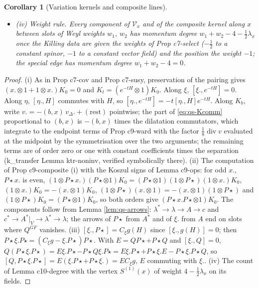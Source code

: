 \documentclass[11pt]{article}
\numberwithin{equation}{section}
\theoremstyle{plain}
\newtheorem{corollary}[theorem]{Corollary}
\theoremstyle{definition}
\begin{document}
\begin{corollary}[Variation kernels and composite lines]
\begin{itemize}
\item (iv) Weight rule. Every component of $\mathcal V_x$ and of the composite kernel along $x$ between slots of Weyl weights $w_1$, $w_2$ has momentum degree $w_1+w_2-4-\tfrac12\lambda_x$ once the Killing data are given the weights of Prop c7-select ($-\tfrac12$ to a constant spinor, $-1$ to a constant vector field) and the position the weight $-1$; the special edge has momentum degree $w_1+w_2-4=0$.
\end{itemize}
\end{corollary}

\begin{proof}
(i) As in Prop c7-cov and Prop c7-susy, preservation of the pairing gives $(x.\otimes1+1\otimes x.)K_0=0$ and $K_t=(e^{-tH}\otimes1)K_0$. Along $\xi$, $[\xi.,e^{-tH}]=0$. Along $\eta$, $[\eta.,H]$ commutes with $H$, so $[\eta.,e^{-tH}]=-t[\eta.,H]e^{-tH}$. Along $K_b$, write $v.=-(b,x)\,v_\Delta.+(\text{rest})$ pointwise; the part of \eqref{eq:qs-Kcomm} proportional to $(b,x)$ is $-(b,x)$ times the dilatation commutators, which integrate to the endpoint terms of Prop c9-ward with the factor $\tfrac18\operatorname{div}v$ evaluated at the midpoint by the symmetrisation over the two arguments; the remaining terms are of order zero or one with constant coefficients times the separation (k\_transfer Lemma ktr-noninv, verified symbolically there). (ii) The computation of Prop c9-composite (i) with the Koszul signs of Lemma c9-ops: for odd $x.$, $P\star x.$ is even, $(1\otimes P\star x.)(P\star\otimes1)K_0=(P\star\otimes1)(1\otimes P\star)(1\otimes x.)K_0$, $(1\otimes x.)K_0=-(x.\otimes1)K_0$, $(1\otimes P\star)(x.\otimes1)=-(x.\otimes1)(1\otimes P\star)$ and $(1\otimes P\star)K_0=(P\star\otimes1)K_0$, so both orders give $(P\star x.P\star\otimes1)K_0$. The components follow from Lemma \ref{lem:qs-arrows}: $\lambda^*\to\lambda\to A\to c$ and $c^*\to A^*|_V\to\lambda^*\to\lambda$; the arrows of $P\star$ from $A^*$ and of $\xi.$ from $A$ end on slots where $Q^{GF}$ vanishes. (iii) $[\xi.,P\star]=C_\xi g(H)$ since $[\xi.,g(H)]=0$; then $P\star\xi.P\star=(C_\xi g-\xi.P\star)P\star$. With $E=QP\star+P\star Q$ and $[\xi.,Q]=0$, $Q(P\star\xi.P\star)=E\xi.P\star-P\star Q\xi.P\star=E\xi.P\star+P\star\xi.E-P\star\xi.P\star Q$, so $[Q,P\star\xi.P\star]=E(\xi.P\star+P\star\xi.)=EC_\xi g$, $E$ commuting with $\xi.$. (iv) The count of Lemma c10-degree with the vertex $S^{(1)}(x)$ of weight $4-\tfrac12\lambda_x$ on its fields.
\end{proof}
\end{document}
